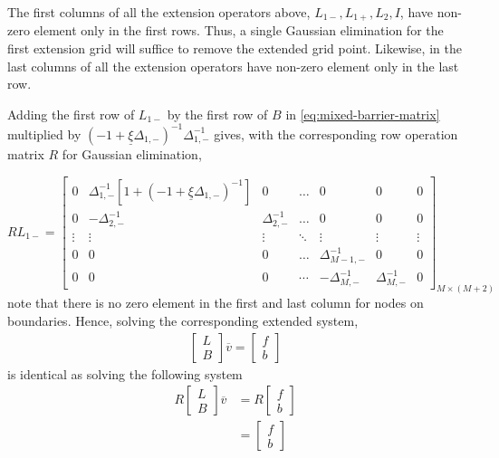 \documentclass[11pt]{article}
\theoremstyle{definition}
\begin{document}
The first columns of all the extension operators above, ${L}_{1-}, {L}_{1+}, {L}_{2}, {I}$, have non-zero element only in the first rows. Thus, a single Gaussian elimination for the first extension grid will suffice to remove the extended grid point. Likewise, in the last columns of all the extension operators have non-zero element only in the last row.


Adding the first row of $L_{1-}$ by the first row of $B$ in \eqref{eq:mixed-barrier-matrix} multiplied by $(-1 + \underline{\xi} \Delta_{1,-} )^{-1}\Delta_{1,-}^{-1}$ gives, with the corresponding row operation matrix $R$ for Gaussian elimination,

\begin{equation}
R {L}_{1-} = \begin{bmatrix}
0&\Delta_{1,-}^{-1} \left[ 1 + (-1+\underline{\xi} \Delta_{1,-} )^{-1} \right] &0&\dots&0&0&0\\
0&-\Delta_{2,-}^{-1}&\Delta_{2,-}^{-1}&\dots&0&0&0\\
\vdots&\vdots&\vdots&\ddots&\vdots&\vdots&\vdots\\
0&0&0&\dots&\Delta_{M-1,-}^{-1}&0&0\\
0&0&0&\cdots&-\Delta_{M,-}^{-1}&\Delta_{M,-}^{-1}&0
\end{bmatrix}_{M\times (M+2)}
\end{equation}
note that there is no zero element in the first and last column for nodes on boundaries. Hence, solving the corresponding extended system,
\begin{align}
\begin{bmatrix}
{L}\\
B
\end{bmatrix} 
\overline{v}
=
\begin{bmatrix}
f \\ b
\end{bmatrix}
\end{align}
is identical as solving the following system
\begin{align}
R
\begin{bmatrix}
{L}\\
B
\end{bmatrix} 
\overline{v}
&=
R
\begin{bmatrix}
f \\ b
\end{bmatrix} \\
&= \begin{bmatrix}
f \\ b
\end{bmatrix}
\end{align}
\end{document}
